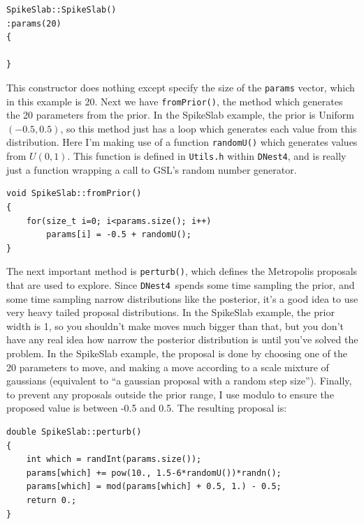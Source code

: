 \documentclass[a4paper, 11pt]{article}
\newcommand{\dnest}{{\tt DNest4}}
\begin{document}
\begin{framed}
\begin{verbatim}
SpikeSlab::SpikeSlab()
:params(20)
{

}
\end{verbatim}
\end{framed}

This constructor does nothing except specify the size of the {\tt params}
vector, which in this example is 20. Next we have {\tt fromPrior()}, the
method which generates the 20 parameters from the prior. In the SpikeSlab
example, the prior is Uniform$(-0.5, 0.5)$, so this method just has a loop
which generates each value from this distribution. Here I'm making use of
a function {\tt randomU()} which generates values from $U(0, 1)$. This function
is defined in {\tt Utils.h} within \dnest, and is really just a function
wrapping a call to GSL's random number generator.\\

\begin{framed}
\begin{verbatim}
void SpikeSlab::fromPrior()
{
    for(size_t i=0; i<params.size(); i++)
        params[i] = -0.5 + randomU();
}
\end{verbatim}
\end{framed}

The next important method is {\tt perturb()}, which defines the Metropolis
proposals that are used to explore. Since \dnest~spends some time sampling
the prior, and some time sampling narrow distributions like the posterior,
it's a good idea to use very heavy tailed proposal distributions. In the
SpikeSlab example, the prior width is 1, so you shouldn't make moves much
bigger than that, but you don't have any real idea how narrow the posterior
distribution is until you've solved the problem. In the SpikeSlab example,
the proposal is done by choosing one of the 20 parameters to move, and making
a move according to a scale mixture of gaussians (equivalent to ``a gaussian
proposal with a random step size''). Finally, to prevent any proposals outside
the prior range, I use modulo to ensure the proposed value is between -0.5
and 0.5. The resulting proposal is:\\

\begin{framed}
\begin{verbatim}
double SpikeSlab::perturb()
{
    int which = randInt(params.size());
    params[which] += pow(10., 1.5-6*randomU())*randn();
    params[which] = mod(params[which] + 0.5, 1.) - 0.5;
    return 0.;
}
\end{verbatim}
\end{framed}
\end{document}
